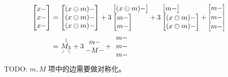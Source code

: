 \renewcommand*{\arraystretch}{1}
\begin{align*}
\begin{bmatrix}
   x - \\
   x - \\
   x -
\end{bmatrix}
&=
\begin{bmatrix}
   (x\ominus m) - \\
   (x\ominus m) - \\
   (x\ominus m) -
\end{bmatrix}
\vspace{-.5em}
+
3
\hspace{-.25em}
\begin{array}{l}
\begin{bmatrix}
   (x\ominus m) -
\end{bmatrix}\\[.1em]
\begin{bmatrix}
   m - \\
   m -
\end{bmatrix}
\end{array}
\hspace{-.5em}
+
3
\hspace{-.25em}
\begin{array}{l}
\begin{bmatrix}
   m -
\end{bmatrix}\\[.1em]
\begin{bmatrix}
   (x\ominus m) - \\
   (x\ominus m) -
\end{bmatrix}
\end{array}
\hspace{-.5em}
+
\hspace{-.5em}
\begin{array}{c}
\begin{bmatrix}
   m -
\end{bmatrix}\\[.1em]
\begin{bmatrix}
   m -
\end{bmatrix}\\[.1em]
\begin{bmatrix}
   m -
\end{bmatrix}
\end{array}
%
\\&=
\begin{tikzpicture}[baseline=(T.base), inner sep=1pt]
   \node (T) {$M_3$};
   \draw (T) -- ++(0,.4);
   \draw (T) -- ++(-.2,-.35);
   \draw (T) -- ++(.2,-.35);
\end{tikzpicture}
+
3
\hspace{-.25em}
\begin{array}{c}
   m - \\
   -M-
\end{array}
\hspace{-.5em}
+
\begin{array}{c}
   m - \\
   m - \\
   m -
\end{array}
\end{align*}
TODO: $m,M$ 项中的边需要做对称化。


